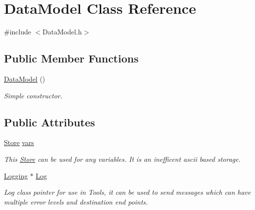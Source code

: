 \hypertarget{classDataModel}{\section{Data\-Model Class Reference}
\label{classDataModel}
}


{\ttfamily \#include $<$Data\-Model.\-h$>$}

\subsection*{Public Member Functions}
\begin{DoxyCompactItemize}
\item 
\hypertarget{classDataModel_abff03aef2cb531142a35781bb87c3365}{\hyperlink{classDataModel_abff03aef2cb531142a35781bb87c3365}{Data\-Model} ()}\label{classDataModel_abff03aef2cb531142a35781bb87c3365}

\begin{DoxyCompactList}\small\item\em Simple constructor. \end{DoxyCompactList}\end{DoxyCompactItemize}
\subsection*{Public Attributes}
\begin{DoxyCompactItemize}
\item 
\hypertarget{classDataModel_a4baac5fe364a7a23762d70d2c2216486}{\hyperlink{classStore}{Store} \hyperlink{classDataModel_a4baac5fe364a7a23762d70d2c2216486}{vars}}\label{classDataModel_a4baac5fe364a7a23762d70d2c2216486}

\begin{DoxyCompactList}\small\item\em This \hyperlink{classStore}{Store} can be used for any variables. It is an inefficent ascii based storage. \end{DoxyCompactList}\item 
\hypertarget{classDataModel_aa777da4c632e4659ee5b1447ad513458}{\hyperlink{classLogging}{Logging} $\ast$ \hyperlink{classDataModel_aa777da4c632e4659ee5b1447ad513458}{Log}}\label{classDataModel_aa777da4c632e4659ee5b1447ad513458}

\begin{DoxyCompactList}\small\item\em Log class pointer for use in Tools, it can be used to send messages which can have multiple error levels and destination end points. \end{DoxyCompactList}\end{DoxyCompactItemize}


